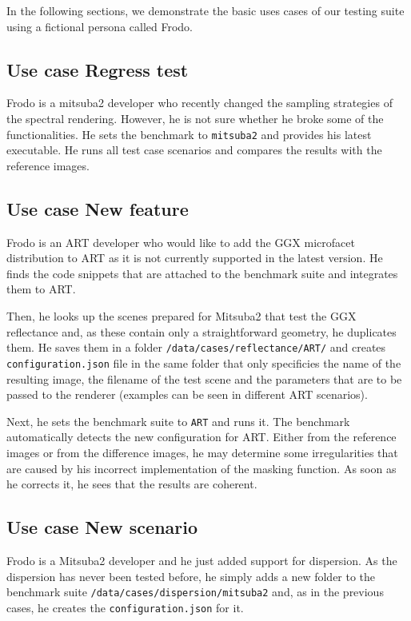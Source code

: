 In the following sections, we demonstrate the basic uses cases of our testing suite using a fictional persona called Frodo.

\subsection{Use case Regress test}

Frodo is a mitsuba2 developer who recently changed the sampling strategies of the spectral rendering. However, he is not sure whether he broke some of the functionalities. He sets the benchmark to \texttt{mitsuba2} and provides his latest executable. He runs all test case scenarios and compares the results with the reference images.
 
\subsection{Use case New feature}
\label{sec:frodo}
Frodo is an ART developer who would like to add the GGX microfacet distribution to ART as it is not currently supported in the latest version. He finds the code snippets that are attached to the benchmark suite and integrates them to ART.

Then, he looks up the scenes prepared for Mitsuba2 that test the GGX reflectance and, as these contain only a straightforward geometry, he duplicates them. He saves them in a folder \texttt{/data/cases/reflectance/ART/} and creates \texttt{configuration.json} file in the same folder that only specificies the name of the resulting image, the filename of the test scene and the parameters that are to be passed to the renderer (examples can be seen in different ART scenarios).

Next, he sets the benchmark suite to \texttt{ART} and runs it. The benchmark automatically detects the new configuration for ART. Either from the reference images or from the difference images, he may determine some irregularities that are caused by his incorrect implementation of the masking function. As soon as he corrects it, he sees that the results are coherent.

\subsection{Use case New scenario}

Frodo is a Mitsuba2 developer and he just added support for dispersion. As the dispersion has never been tested before, he simply adds a new folder to the benchmark suite \texttt{/data/cases/dispersion/mitsuba2} and, as in the previous cases, he creates the \texttt{configuration.json} for it.

